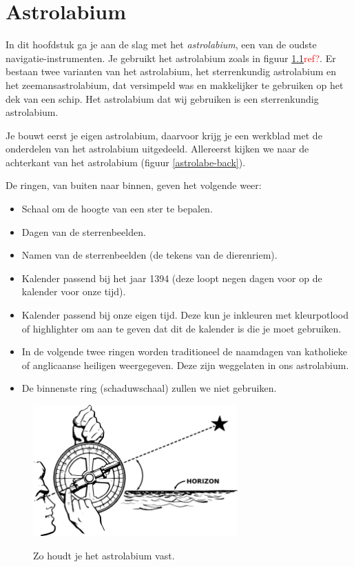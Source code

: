\chapter{Astrolabium}

In dit hoofdstuk ga je aan de slag met het \textit{astrolabium}, een van de oudste navigatie-instrumenten. Je gebruikt het astrolabium zoals in figuur \ref{astrolabe-face}\textcolor{red}{ref?}. Er bestaan twee varianten van het astrolabium, het sterrenkundig astrolabium en het zeemansastrolabium, dat versimpeld was en makkelijker te gebruiken op het dek van een schip. Het astrolabium dat wij gebruiken is een sterrenkundig astrolabium.

Je bouwt eerst je eigen astrolabium, daarvoor krijg je een werkblad met de onderdelen van het astrolabium uitgedeeld. Allereerst kijken we naar de achterkant van het astrolabium (figuur \ref{astrolabe-back}).

De ringen, van buiten naar binnen, geven het volgende weer:
\begin{itemize}
 \item Schaal om de hoogte van een ster te bepalen.
 \item Dagen van de sterrenbeelden.
 \item Namen van de sterrenbeelden (de tekens van de dierenriem).
 \item Kalender passend bij het jaar 1394 (deze loopt negen dagen voor op de kalender voor onze tijd).
 \item Kalender passend bij onze eigen tijd. Deze kun je inkleuren met kleurpotlood of highlighter om aan te geven dat dit de kalender is die je moet gebruiken.
 \item In de volgende twee ringen worden traditioneel de naamdagen van katholieke of anglicaanse heiligen weergegeven. Deze zijn weggelaten in ons astrolabium.
 \item De binnenste ring (schaduwschaal) zullen we niet gebruiken.
\end{itemize}

\begin{figure}[!b]
\centering
 \includegraphics[width=0.7\textwidth]{astrolabe-hi.png}
 \label{astrolabe-face}
 \caption{Zo houdt je het astrolabium vast.}
\end{figure}

